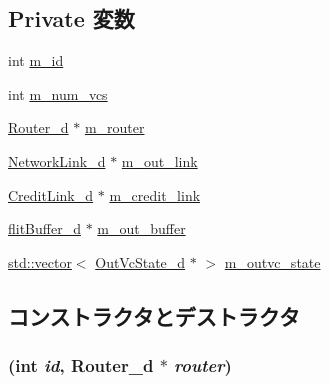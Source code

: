 \subsection*{Private 変数}
\begin{DoxyCompactItemize}
\item 
int \hyperlink{classOutputUnit__d_aad966617e7e050bedbead762727808a5}{m\_\-id}
\item 
int \hyperlink{classOutputUnit__d_a2e1a9213321dfa0386cdedaf6fc22996}{m\_\-num\_\-vcs}
\item 
\hyperlink{classRouter__d}{Router\_\-d} $\ast$ \hyperlink{classOutputUnit__d_a81d53a65b375007289068e764da769d8}{m\_\-router}
\item 
\hyperlink{classNetworkLink__d}{NetworkLink\_\-d} $\ast$ \hyperlink{classOutputUnit__d_ad6b6f290562e57546ef09c211721a199}{m\_\-out\_\-link}
\item 
\hyperlink{classCreditLink__d}{CreditLink\_\-d} $\ast$ \hyperlink{classOutputUnit__d_a8439db4fc7b7271dfca6bf98b13036a4}{m\_\-credit\_\-link}
\item 
\hyperlink{classflitBuffer__d}{flitBuffer\_\-d} $\ast$ \hyperlink{classOutputUnit__d_a41dd924ecf4c977d4f4e5251e8076a0e}{m\_\-out\_\-buffer}
\item 
\hyperlink{classstd_1_1vector}{std::vector}$<$ \hyperlink{classOutVcState__d}{OutVcState\_\-d} $\ast$ $>$ \hyperlink{classOutputUnit__d_ae14b2f87437379bc1ab5b4cc523e1406}{m\_\-outvc\_\-state}
\end{DoxyCompactItemize}


\subsection{コンストラクタとデストラクタ}
\hypertarget{classOutputUnit__d_ac289b42d245e455ff295053759e6548c}{
\subsubsection[{OutputUnit\_\-d}]{ (int {\em id}, \/  {\bf Router\_\-d} $\ast$ {\em router})}}
\label{classOutputUnit__d_ac289b42d245e455ff295053759e6548c}



